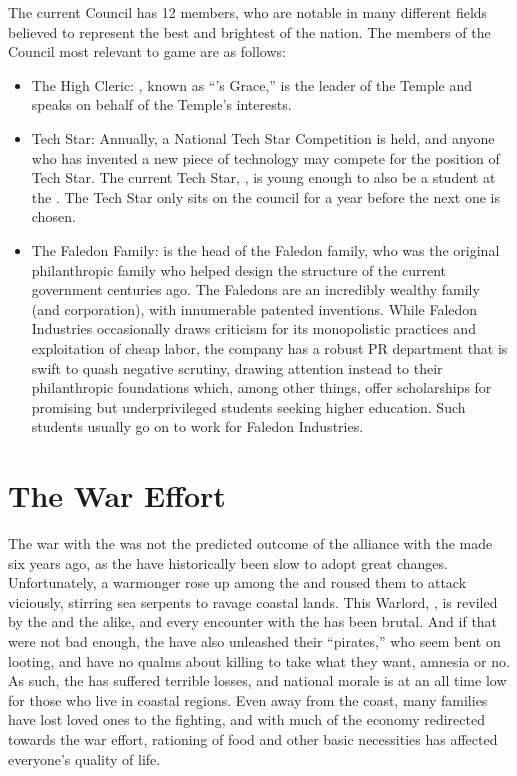 \documentclass[blue]{GL2020}
\begin{document}
The current Council has 12 members, who are notable in many different fields believed to represent the best and brightest of the nation. The members of the Council most relevant to game are as follows:
\begin{itemize}
    \item The High Cleric: \cAntiChup{\full}, known as ``\cTechGod{}'s Grace,'' is the leader of the Temple and speaks on behalf of the Temple's interests.
    \item Tech Star: Annually, a National Tech Star Competition is held, and anyone who has invented a new piece of technology may compete for the position of Tech Star. The current Tech Star, \cTechStar{\full}, is young enough to also be a student at the \pSchool{}. The Tech Star only sits on the council for a year before the next one is chosen.
    \item The Faledon Family: \cFaledonParent{\full} is the head of the Faledon family, who was the original philanthropic family who helped design the structure of the current government centuries ago. The Faledons are an incredibly wealthy family (and corporation), with innumerable patented inventions. While Faledon Industries occasionally draws criticism for its monopolistic practices and exploitation of cheap labor, the company has a robust PR department that is swift to quash negative scrutiny, drawing attention instead to their philanthropic foundations which, among other things, offer scholarships for promising but underprivileged students seeking higher education. Such students usually go on to work for Faledon Industries.  
\end{itemize}

\section*{The War Effort}
The war with the \pShippies{} was not the predicted outcome of the alliance with the \pFarm{} made six years ago, as the \pShippies{} have historically been slow to adopt great changes. Unfortunately, a warmonger rose up among the \pShippies{} and roused them to attack viciously, stirring sea serpents to ravage coastal lands. This Warlord, \cLoud{\full}, is reviled by the \pTechies{} and the \pFarm{} alike, and every encounter with the \pShippies{} has been brutal. And if that were not bad enough, the \pShippies{} have also unleashed their ``pirates,'' who seem bent on looting, and have no qualms about killing to take what they want, amnesia or no. As such, the \pTech{} has suffered terrible losses, and national morale is at an all time low for those who live in coastal regions. Even away from the coast, many families have lost loved ones to the fighting, and with much of the economy redirected towards the war effort, rationing of food and other basic necessities has affected everyone's quality of life.
\end{document}
